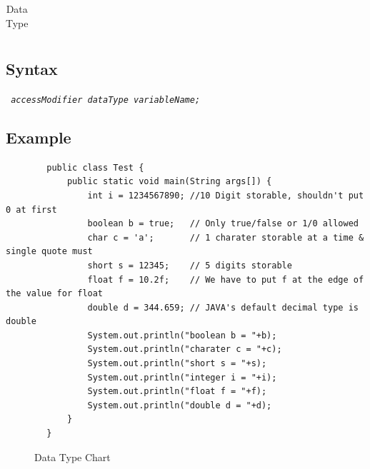 \documentclass[openany]{book}  %
\begin{document}
\begin{flushleft}
\begin{table}[htbp]
\begin{tabular}{|l|l|l|l|l|}
        \end{tabular}
        \centering
        \caption{Data Type}
    \end{table}
    \newpage
    \null\subsection{Syntax}
    \begin{center}
        \tt{
            \textit{accessModifier dataType variableName;}
        }
    \end{center}
    \subsection{Example}
    \begin{center}
        \footnotesize
        \begin{verbatim}
        public class Test {
            public static void main(String args[]) {
                int i = 1234567890; //10 Digit storable, shouldn't put 0 at first
                boolean b = true;   // Only true/false or 1/0 allowed
                char c = 'a';       // 1 charater storable at a time & single quote must
                short s = 12345;    // 5 digits storable
                float f = 10.2f;    // We have to put f at the edge of the value for float
                double d = 344.659; // JAVA's default decimal type is double
                System.out.println("boolean b = "+b);
                System.out.println("charater c = "+c);
                System.out.println("short s = "+s);
                System.out.println("integer i = "+i);
                System.out.println("float f = "+f);
                System.out.println("double d = "+d);
            }
        }
    \end{verbatim}
    \end{center}
    \begin{figure}[htbp]
        \begin{center}
            \caption{Data Type Chart\cite{Ref3}}
        \end{center}
    \end{figure}


\end{flushleft}
\end{document}
